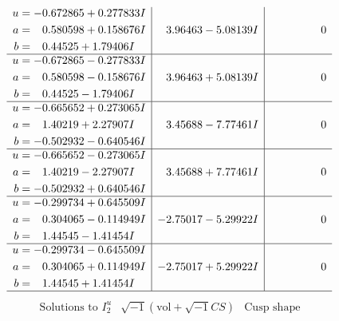 \documentclass[1p]{elsarticle_modified}
\theoremstyle{definition}
\newcommand{\I}{\sqrt{-1}}
\begin{document}
$$\begin{array}{c|c|c}
\begin{aligned}
u &= -0.672865 + 0.277833 I \\
a &= \phantom{-}0.580598 + 0.158676 I \\
b &= \phantom{-}0.44525 + 1.79406 I\end{aligned}
 & \phantom{-}3.96463 - 5.08139 I & \phantom{-0.000000 } 0 \\ \hline\begin{aligned}
u &= -0.672865 - 0.277833 I \\
a &= \phantom{-}0.580598 - 0.158676 I \\
b &= \phantom{-}0.44525 - 1.79406 I\end{aligned}
 & \phantom{-}3.96463 + 5.08139 I & \phantom{-0.000000 } 0 \\ \hline\begin{aligned}
u &= -0.665652 + 0.273065 I \\
a &= \phantom{-}1.40219 + 2.27907 I \\
b &= -0.502932 - 0.640546 I\end{aligned}
 & \phantom{-}3.45688 - 7.77461 I & \phantom{-0.000000 } 0 \\ \hline\begin{aligned}
u &= -0.665652 - 0.273065 I \\
a &= \phantom{-}1.40219 - 2.27907 I \\
b &= -0.502932 + 0.640546 I\end{aligned}
 & \phantom{-}3.45688 + 7.77461 I & \phantom{-0.000000 } 0 \\ \hline\begin{aligned}
u &= -0.299734 + 0.645509 I \\
a &= \phantom{-}0.304065 - 0.114949 I \\
b &= \phantom{-}1.44545 - 1.41454 I\end{aligned}
 & -2.75017 - 5.29922 I & \phantom{-0.000000 } 0 \\ \hline\begin{aligned}
u &= -0.299734 - 0.645509 I \\
a &= \phantom{-}0.304065 + 0.114949 I \\
b &= \phantom{-}1.44545 + 1.41454 I\end{aligned}
 & -2.75017 + 5.29922 I & \phantom{-0.000000 } 0\\
 \hline 
 \end{array}$$\newpage$$\begin{array}{c|c|c}  
\text{Solutions to }I^u_{2}& \I (\text{vol} + \sqrt{-1}CS) & \text{Cusp shape}\\
 \hline 
\begin{aligned}

\end{aligned}
\end{array}$$
\end{document}

